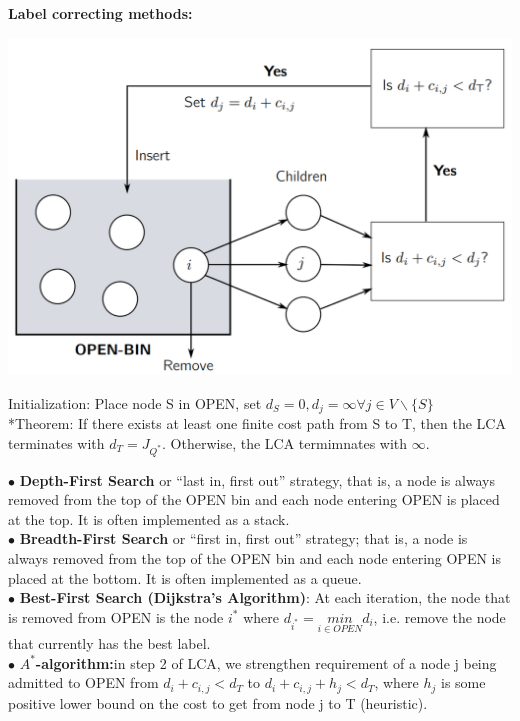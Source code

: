 \documentclass[10pt,landscape]{article}
\newenvironment{Figure}
{\par\medskip\noindent\minipage{\linewidth}}
{\endminipage\par\medskip}
\begin{document}
\begin{multicols*}{4}
\textbf{Label correcting methods:}\\
\begin{Figure}
	\centering
	\includegraphics[width=\linewidth]{pictures/LCM.png}
\end{Figure}
Initialization: Place node S in OPEN, set $d_S=0, d_j=\infty \forall j\in V \backslash\{S\}$\\
*Theorem:  If there exists at least one finite cost path
from S to T, then the LCA terminates with $d_T = J_{Q^{*}}$. Otherwise, the LCA termimnates with $\infty$.

$\bullet$ \textbf{Depth-First Search} or “last in, first out” strategy, that is, a node is always removed from the top of the OPEN bin and each node entering OPEN is placed at the top. It is often implemented as a stack.\\
$\bullet$ \textbf{Breadth-First Search} or “first in, first out” strategy; that is, a node is always removed from the top of the OPEN bin and each node entering OPEN is placed at the bottom. It is often implemented as a queue.\\
$\bullet$ \textbf{Best-First Search (Dijkstra’s Algorithm)}: At each iteration, the node
that is removed from OPEN is the node $i^{*}$ where $d_{i^{*}} = \underset{i \in OPEN}{min} d_i$, i.e. remove the node that currently has the best label.\\
$\bullet$ \textbf{$A^{*}$-algorithm:}in step 2 of LCA, we strengthen requirement of a node j being admitted to OPEN from $d_i+c_{i,j} < d_T$ to $d_i+c_{i,j}+h_j < d_T$, where $h_j$ is some positive lower bound on the cost to get from node j to T (heuristic).


\end{multicols*}
\end{document}

